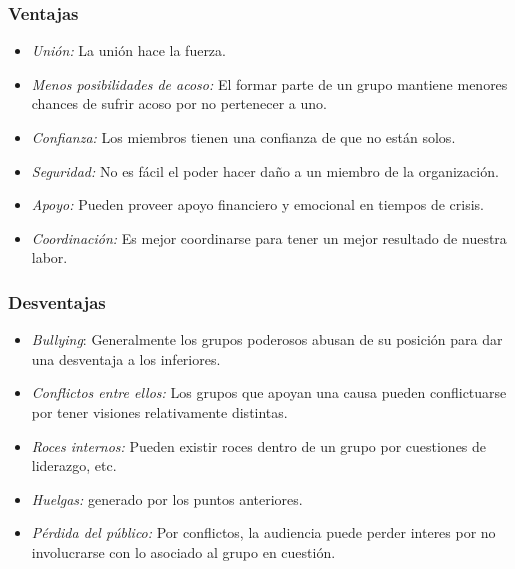 \documentclass[stu, 12pt, letterpaper, donotrepeattitle, floatsintext, natbib]{apa7}
\begin{document}
\subsubsection{Ventajas}
\vspace{\baselineskip}
\begin{justifying}
    \begin{itemize}
        \item \emph{Unión:} La unión hace la fuerza.
        \item \emph{Menos posibilidades de acoso:} El formar parte de un grupo mantiene menores chances de sufrir acoso por no pertenecer a uno.
        \item \emph{Confianza:} Los miembros tienen una confianza de que no están solos.
        \item \emph{Seguridad:} No es fácil el poder hacer daño a un miembro de la organización.
        \item \emph{Apoyo:} Pueden proveer apoyo financiero y emocional en tiempos de crisis.
        \item \emph{Coordinación:} Es mejor coordinarse para tener un mejor resultado de nuestra labor.
    \end{itemize}
\end{justifying}
\subsubsection{Desventajas}
\begin{justifying}
    \begin{itemize}
        \item \emph{Bullying}: Generalmente los grupos poderosos abusan de su posición para dar una desventaja a los inferiores.
        \item \emph{Conflictos entre ellos:} Los grupos que apoyan una causa pueden conflictuarse por tener visiones relativamente distintas.
        \item \emph{Roces internos:} Pueden existir roces dentro de un grupo por cuestiones de liderazgo, etc.
        \item \emph{Huelgas:} generado por los puntos anteriores.
        \item \emph{Pérdida del público:} Por conflictos, la audiencia puede perder interes por no involucrarse con lo asociado al grupo en cuestión.
    \end{itemize}\par
\end{justifying}
\vspace{\baselineskip}
\end{document}
